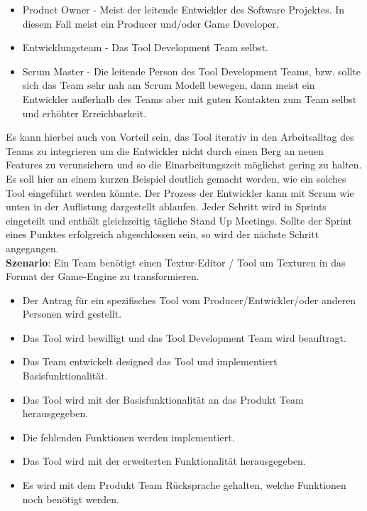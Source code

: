 \documentclass[pagesize, paper=a4, fontsize=12pt, titlepage=true, headings=small, headnosepline, abstractoff, liststotoc, nochapterprefix, plainheadsepline, twoside]{scrreprt}
\begin{document}
\begin{itemize}
\item Product Owner - Meist der leitende Entwickler des Software Projektes. In diesem Fall meist ein Producer und/oder Game Developer.
\item Entwicklungsteam - Das Tool Development Team selbst.
\item Scrum Master - Die leitende Person des Tool Development Teams, bzw. sollte sich das Team sehr nah am Scrum Modell bewegen, dann meist ein Entwickler außerhalb des Teams aber mit guten Kontakten zum Team selbst und erhöhter Erreichbarkeit.
\end{itemize}
Es kann hierbei auch von Vorteil sein, das Tool iterativ in den Arbeitsalltag des Teams zu integrieren um die Entwickler nicht durch einen Berg an neuen Features zu verunsichern und so die Einarbeitungszeit möglichst gering zu halten.
\\
Es soll hier an einem kurzen Beispiel deutlich gemacht werden, wie ein solches Tool eingeführt werden könnte. Der Prozess der Entwickler kann mit Scrum wie unten in der Auflistung dargestellt ablaufen. Jeder Schritt wird in Sprints eingeteilt und enthält gleichzeitig tägliche Stand Up Meetings. Sollte der Sprint eines Punktes erfolgreich abgeschlossen sein, so wird der nächste Schritt angegangen.
\\
\textbf{Szenario}: Ein Team benötigt einen Textur-Editor / Tool um Texturen in das Format der Game-Engine zu transformieren.
\begin{itemize}
\item Der Antrag für ein spezifisches Tool vom Producer/Entwickler/oder anderen Personen wird gestellt.
\item Das Tool wird bewilligt und das Tool Development Team wird beauftragt.
\item Das Team entwickelt designed das Tool und implementiert Basisfunktionalität.
\item Das Tool wird mit der Basisfunktionalität an das Produkt Team herausgegeben.
\item Die fehlenden Funktionen werden implementiert.
\item Das Tool wird mit der erweiterten Funktionalität herausgegeben.
\item Es wird mit dem Produkt Team Rücksprache gehalten, welche Funktionen noch benötigt werden.
\end{itemize}
\end{document}
